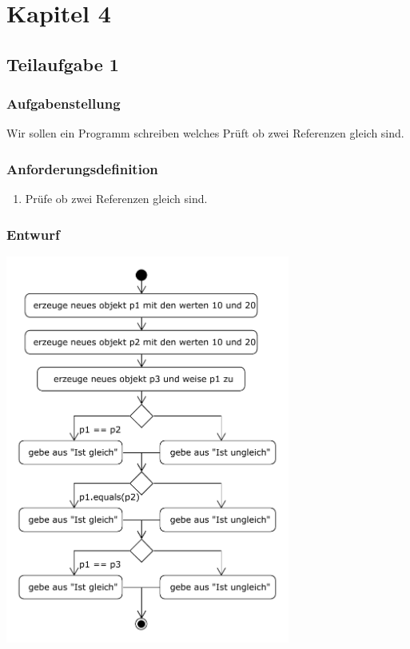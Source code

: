 \section{Kapitel 4}
\subsection{Teilaufgabe 1}
\subsubsection{Aufgabenstellung}
Wir sollen ein Programm schreiben welches Prüft ob zwei Referenzen gleich sind.

\subsubsection{Anforderungsdefinition}
\begin{enumerate}
	\item Prüfe ob zwei Referenzen gleich sind.
\end{enumerate}

\subsubsection{Entwurf}
\begin{center}
	\includegraphics[width=0.7\textwidth]{uml/uml_c4_p1.pdf}
\end{center}

